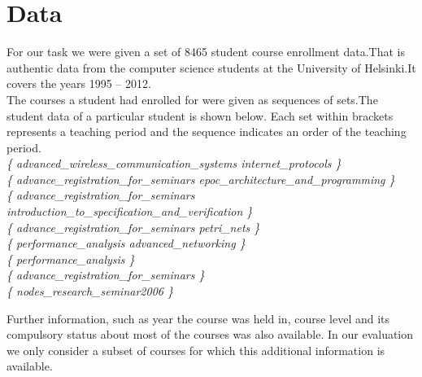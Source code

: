 \section{Data}
For our task we were given a set of 8465 student course enrollment data.That is authentic data from the computer science students at the University of Helsinki.It covers the years 1995 – 2012.\\

The courses a student had enrolled for were given as sequences of sets.The student data of a particular student is shown below. Each set within { } brackets represents a teaching period and the sequence indicates an order of the teaching period.\\

\textit{
\{ advanced\_wireless\_communication\_systems internet\_protocols \}\\
\{ advance\_registration\_for\_seminars epoc\_architecture\_and\_programming \}\\
\{ advance\_registration\_for\_seminars introduction\_to\_specification\_and\_verification \}\\
\{ advance\_registration\_for\_seminars petri\_nets \}\\
\{ performance\_analysis advanced\_networking \}\\
\{ performance\_analysis \}\\
\{ advance\_registration\_for\_seminars \}\\
\{ nodes\_research\_seminar2006 \}\\
}

Further information, such as year the course was held in,  course level and its compulsory status about most of the courses was also available. In our evaluation we only consider a subset of courses for which this additional information is available.
